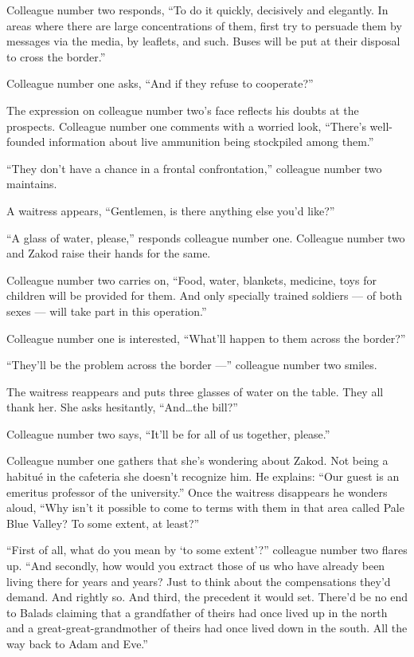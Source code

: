 \documentclass[twoside,11pt,openany]{book}
\begin{document}
Colleague number two responds, ``To do it quickly, decisively and elegantly. In areas where there are large
concentrations of them, first try to persuade them by messages via the media, by leaflets, and such. Buses will be put
at their disposal to cross the border.''

Colleague number one asks, ``And if they refuse to cooperate?''

The expression on colleague number two's face reflects his doubts at the prospects. Colleague number one comments with a
worried look, ``There's well-founded information about live ammunition being
stockpiled among them.''

``They don't have a chance in a frontal confrontation,'' colleague number two maintains.

A waitress appears, ``Gentlemen, is there anything else you'd like?''

``A glass of water, please,'' responds colleague number one. Colleague number two and Zakod
raise their hands for the same.

Colleague number two carries on, ``Food, water, blankets, medicine, toys for children will be provided for
them.  And only specially trained soldiers --- of both sexes --- will take part in this operation.''

Colleague number one is interested, ``What'll happen to them across the border?''

``They'll be the problem across the border ---'' colleague number two smiles.

The waitress reappears and puts three glasses of water on the table. They all thank her. She asks hesitantly,
``And{\ldots}the bill?''

Colleague number two says, ``It'll be for all of us together, please.''

Colleague number one gathers that she's wondering about Zakod. Not being a habitu\'e in the cafeteria she doesn't
recognize him. He explains: ``Our guest is an emeritus professor of the university.'' Once
the waitress disappears he wonders aloud, ``Why isn't it possible to come to terms with them in that area
called Pale Blue Valley? To some extent, at least?''

``First of all, what do you mean by `to some extent'?'' colleague number two flares up.
``And secondly, how would you extract those of us who have already been living there for years and years?
Just to think about the compensations they'd demand. And rightly so. And third, the precedent it would set. There'd be
no end to Balads claiming that a grandfather of theirs had once lived up in the north and a great-great-grandmother of
theirs had once lived down in the south. All the way back to Adam and Eve.''
\end{document}
